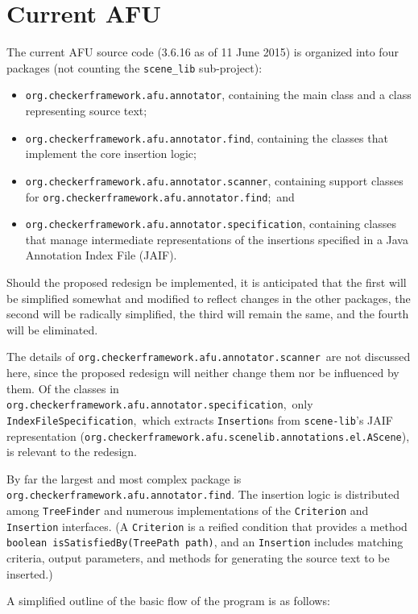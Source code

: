 \documentclass{article}
\begin{document}
\section{Current AFU}

The current AFU source code (3.6.16 as of 11 June 2015) is organized
into four packages (not counting the
\texttt{scene\_lib} sub-project):
\begin{itemize}
\item  \texttt{org.checkerframework.afu.annotator}, containing the main class and a class
representing source text;
\item  \texttt{org.checkerframework.afu.annotator.find}, containing the classes that implement
the core insertion logic;
\item  \texttt{org.checkerframework.afu.annotator.scanner}, containing support classes for
\texttt{org.checkerframework.afu.annotator.find};\ and
\item  \texttt{org.checkerframework.afu.annotator.specification}, containing classes that
manage intermediate representations of the insertions specified in a
Java Annotation Index File (JAIF).
\end{itemize}
Should the proposed redesign be implemented, it is anticipated that the
first will be simplified somewhat and modified to reflect changes in the
other packages, the second will be radically simplified, the third will
remain the same, and the fourth will be eliminated.

The details of \texttt{org.checkerframework.afu.annotator.scanner}\ are not discussed here, since
the proposed redesign will neither change them nor be influenced by
them.  Of the classes in \texttt{org.checkerframework.afu.annotator.specification},\ only
\texttt{IndexFileSpecification},\ which extracts \texttt{Insertion}s
from \texttt{scene-lib}'s JAIF representation
(\texttt{org.checkerframework.afu.scenelib.annotations.el.AScene}), is relevant to the redesign.

By far the largest and most complex package is \texttt{org.checkerframework.afu.annotator.find}.
The insertion logic is distributed among \texttt{TreeFinder} and
numerous implementations of the \texttt{Criterion} and
\texttt{Insertion} interfaces.  (A \texttt{Criterion} is a reified
condition that provides a method
\texttt{boolean isSatisfiedBy(TreePath path)},
and an \texttt{Insertion} includes matching criteria, output parameters,
and methods for generating the source text to be inserted.)

A simplified outline of the basic flow of the program is as follows:
\end{document}
